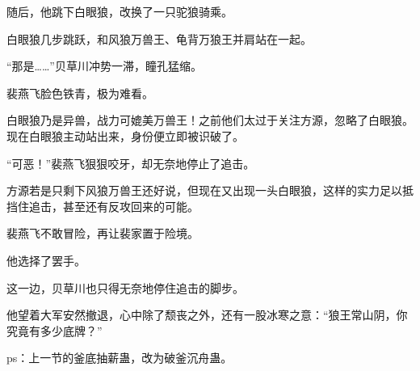 \begin{this_body}
随后，他跳下白眼狼，改换了一只驼狼骑乘。

白眼狼几步跳跃，和风狼万兽王、龟背万狼王并肩站在一起。

“那是……”贝草川冲势一滞，瞳孔猛缩。

裴燕飞脸色铁青，极为难看。

白眼狼乃是异兽，战力可媲美万兽王！之前他们太过于关注方源，忽略了白眼狼。现在白眼狼主动站出来，身份便立即被识破了。

“可恶！”裴燕飞狠狠咬牙，却无奈地停止了追击。

方源若是只剩下风狼万兽王还好说，但现在又出现一头白眼狼，这样的实力足以抵挡住追击，甚至还有反攻回来的可能。

裴燕飞不敢冒险，再让裴家置于险境。

他选择了罢手。

这一边，贝草川也只得无奈地停住追击的脚步。

他望着大军安然撤退，心中除了颓丧之外，还有一股冰寒之意：“狼王常山阴，你究竟有多少底牌？”

ps：上一节的釜底抽薪蛊，改为破釜沉舟蛊。

\end{this_body}

